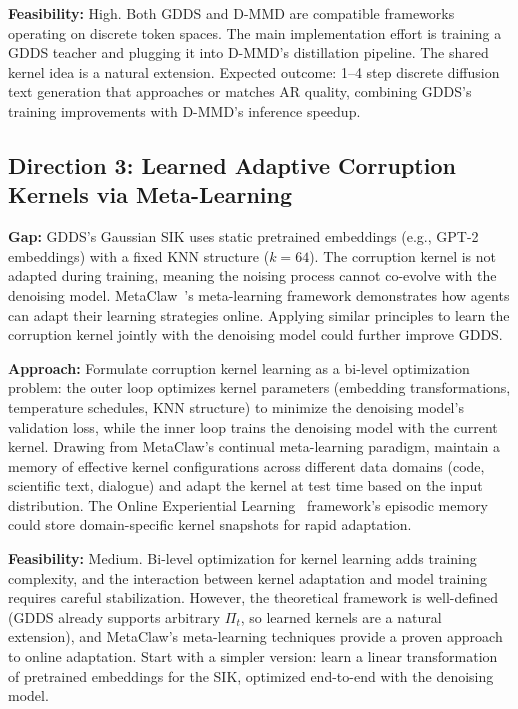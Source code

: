 \documentclass[11pt]{article}
\begin{document}
\textbf{Feasibility:} High. Both GDDS and D-MMD are compatible frameworks operating on discrete token spaces. The main implementation effort is training a GDDS teacher and plugging it into D-MMD's distillation pipeline. The shared kernel idea is a natural extension. Expected outcome: 1--4 step discrete diffusion text generation that approaches or matches AR quality, combining GDDS's training improvements with D-MMD's inference speedup.

\subsection{Direction 3: Learned Adaptive Corruption Kernels via Meta-Learning}

\textbf{Gap:} GDDS's Gaussian SIK uses static pretrained embeddings (e.g., GPT-2 embeddings) with a fixed KNN structure ($k=64$). The corruption kernel is not adapted during training, meaning the noising process cannot co-evolve with the denoising model. MetaClaw~\cite{metaclaw}'s meta-learning framework demonstrates how agents can adapt their learning strategies online. Applying similar principles to learn the corruption kernel jointly with the denoising model could further improve GDDS.

\textbf{Approach:} Formulate corruption kernel learning as a bi-level optimization problem: the outer loop optimizes kernel parameters (embedding transformations, temperature schedules, KNN structure) to minimize the denoising model's validation loss, while the inner loop trains the denoising model with the current kernel. Drawing from MetaClaw's continual meta-learning paradigm, maintain a memory of effective kernel configurations across different data domains (code, scientific text, dialogue) and adapt the kernel at test time based on the input distribution. The Online Experiential Learning~\cite{oel} framework's episodic memory could store domain-specific kernel snapshots for rapid adaptation.

\textbf{Feasibility:} Medium. Bi-level optimization for kernel learning adds training complexity, and the interaction between kernel adaptation and model training requires careful stabilization. However, the theoretical framework is well-defined (GDDS already supports arbitrary $\Pi_t$, so learned kernels are a natural extension), and MetaClaw's meta-learning techniques provide a proven approach to online adaptation. Start with a simpler version: learn a linear transformation of pretrained embeddings for the SIK, optimized end-to-end with the denoising model.
\end{document}
